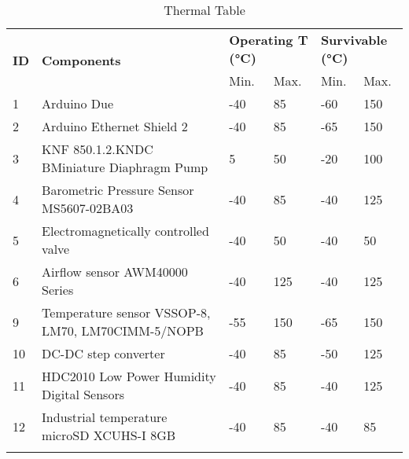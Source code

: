 
\begin{longtable}{|m{1cm}|m{3.5cm}|m{1cm}|m{1cm}|m{1cm}|m{1cm}|}
\hline
\multirow{2}{*}{\textbf{ID}} & \multirow{2}{*}{\textbf{Components}}                                 & \multicolumn{2}{l|}{\textbf{Operating T (°C)}} & \multicolumn{2}{l|}{\textbf{Survivable (°C)}} \\ \cline{3-6} 
                             &                                                                      & Min.                   & Max.                  & Min.                  & Max.                  \\ \hline
1                            & Arduino Due                                                          & -40                    & 85                    & -60                   & 150                   \\ \hline
2                            & Arduino Ethernet Shield 2                                            & -40                    & 85                    & -65                   & 150                   \\ \hline
3                           & KNF   850.1.2.KNDC   BMiniature Diaphragm Pump                                                            & 5                      & 50                      & -20                    & 100                      \\ \hline
4                            & Barometric Pressure Sensor MS5607-02BA03                             & -40                    & 85                    & -40                   & 125                   \\ \hline
5                          & Electromagnetically controlled valve                                 &  -40                      & 50              & -40                      & 50                      \\ \hline
6                            & Airflow sensor AWM40000 Series                                       & -40                    & 125                   & -40                   & 125                   \\ \hline
9                            & Temperature sensor VSSOP-8, LM70, LM70CIMM-5/NOPB & -55                    & 150                   & -65                   & 150                   \\ \hline
10                            & DC-DC step converter                                                 & -40                       & 85                       & -50                      & 125                      \\ \hline
11                           & HDC2010 Low Power Humidity Digital Sensors                           & -40                    & 85                    & -40                   & 125                   \\ \hline
12                           & Industrial temperature microSD XCUHS-I 8GB                           & -40                    & 85                    & -40                   & 85                    \\ \hline


\caption{Thermal Table}
\label{tab:thermal-table}
\end{longtable}
\raggedbottom